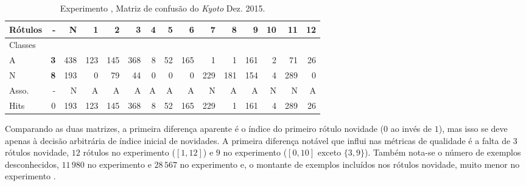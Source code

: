 \begin{table}[hbt]%
  {\footnotesize
  \begin{center}
  \caption{Experimento \expA, Matriz de confusão do \dataset \emph{Kyoto} Dez. 2015.}
  \label{tab:java-matrix}
  \begin{tabular}{l *{14}{|r} }
    Rótulos   &     - &       N &  \textbf{1} &    2 &    3 &  4 &   5 &    6 &    7 &     8 &    9 &    10 &   11 &  \textbf{12} \\\hline
    Classes  &       &         &      &      &      &    &     &      &      &       &      &       &      &     \\\hline
    \hline
    A        &  \textbf{3} &  438 &  123 &  145 &  368 &  8 &  52 &  165 &    1 &  1 &  161 &  2 &   71 &  26 \\\hline
    N        &  \textbf{8} &  193 &    0 &   79 &   44 &  0 &   0 &    0 &  229 &   181 &  154 &  4 &  289 &   0 \\\hline
    \hline
    Asso.   &     - &       N &    A &    A &    A &  A &   A &    A &    N &     A &    A &     N &    N &   A \\\hline
    Hits    &     0 &  193 &  123 &  145 &  368 &  8 &  52 &  165 &  229 &  1 &  161 &  4 &  289 &  26 
  \end{tabular}
\end{center}
}
\end{table}

Comparando as duas matrizes, a primeira diferença aparente é o índice do
primeiro rótulo novidade ($0$ ao invés de $1$), mas isso se deve apenas à decisão
arbitrária de índice inicial de novidades.
A primeira diferença notável que influi nas métricas de qualidade é a falta de 3
rótulos novidade, $12$ rótulos no experimento \expA ($[1,12]$) e $9$ no
experimento \expB ($[0,10]$ exceto $\{3,9\}$).
Também nota-se o número de exemplos desconhecidos,
$11\,980$ no experimento \expA e
$28\,567$ no experimento \expB e, o montante de exemplos incluídos nos rótulos
novidade, muito menor no experimento \expB.

